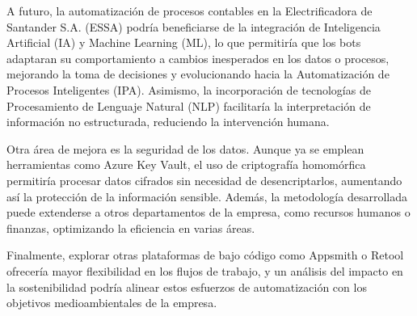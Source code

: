 \documentclass[letter,oneside,12pt,spanish]{report}
\begin{document}
\noindent A futuro, la automatización de procesos contables en la Electrificadora de Santander S.A. (ESSA) podría beneficiarse de la integración de Inteligencia Artificial (IA) y Machine Learning (ML), lo que permitiría que los bots adaptaran su comportamiento a cambios inesperados en los datos o procesos, mejorando la toma de decisiones y evolucionando hacia la Automatización de Procesos Inteligentes (IPA). Asimismo, la incorporación de tecnologías de Procesamiento de Lenguaje Natural (NLP) facilitaría la interpretación de información no estructurada, reduciendo la intervención humana.

\noindent Otra área de mejora es la seguridad de los datos. Aunque ya se emplean herramientas como Azure Key Vault, el uso de criptografía homomórfica permitiría procesar datos cifrados sin necesidad de desencriptarlos, aumentando así la protección de la información sensible. Además, la metodología desarrollada puede extenderse a otros departamentos de la empresa, como recursos humanos o finanzas, optimizando la eficiencia en varias áreas.

\noindent Finalmente, explorar otras plataformas de bajo código como Appsmith o Retool ofrecería mayor flexibilidad en los flujos de trabajo, y un análisis del impacto en la sostenibilidad podría alinear estos esfuerzos de automatización con los objetivos medioambientales de la empresa.








\newpage

%
%

\printbibliography



\nocite{poniszewska-maranda, burns-kubernetes, torres-bosch-microservicios, armstrong2015,kubevirtio, docker2023, kubelet-doc, namespace-article}



\end{document}
